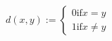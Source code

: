 \documentclass[preview]{standalone}
\begin{document}
\begin{align*}
d(x,y) := \begin{cases} 0 \text{if} x=y \\1 \text{if} x \neq y\end{cases}
\end{align*}
\end{document}
